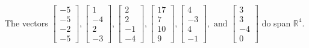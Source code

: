 \begin{exercise}
\begin{exerciseStatement}
  \end{exerciseStatement}
  \begin{exerciseAnswer}
   The vectors \(\left[\begin{array}{r}
-5 \\
-5 \\
-2 \\
-5
\end{array}\right] , \left[\begin{array}{r}
1 \\
-4 \\
2 \\
-3
\end{array}\right] , \left[\begin{array}{r}
2 \\
2 \\
-1 \\
-4
\end{array}\right] , \left[\begin{array}{r}
17 \\
7 \\
10 \\
9
\end{array}\right] , \left[\begin{array}{r}
4 \\
-3 \\
4 \\
-1
\end{array}\right] , \text{ and } \left[\begin{array}{r}
3 \\
3 \\
-4 \\
0
\end{array}\right]\) 
  	 do  
	span \(\mathbb{R}^4\).
  


  \end{exerciseAnswer}
\end{exercise}